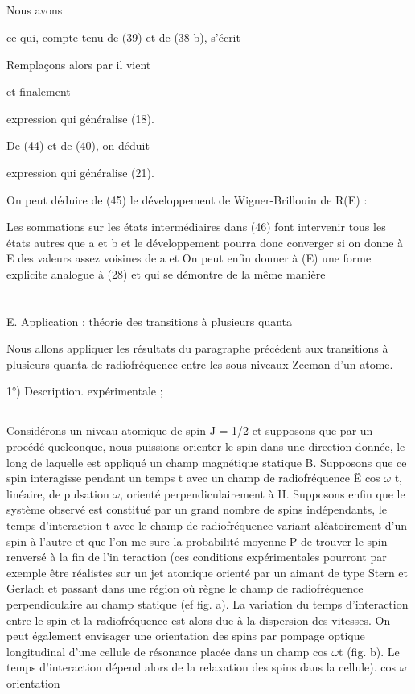 \subsection{}%
Nous avons

ce qui, compte tenu de (39) et de (38-b), s'écrit

Remplaçons alors  par  il vient

et finalement

expression qui généralise (18).

De (44) et de (40), on déduit

expression qui généralise (21).

On peut déduire de (45) le développement de Wigner-Brillouin de R(E) :

Les sommations sur les états intermédiaires dans (46) font intervenir tous les
états autres que a et b et le développement pourra donc converger si on donne
à E des valeurs assez voisines de a et
On peut enfin donner à (E) une forme explicite analogue à (28) et qui
se démontre de la même manière

\section{}
E. Application : théorie des transitions à plusieurs quanta

Nous allons appliquer les résultats du paragraphe précédent aux
transitions à plusieurs quanta de radiofréquence entre les sous-niveaux
Zeeman d'un atome.

1°) Description. expérimentale ;

\subsection{}%
Considérons un niveau atomique de spin J = 1/2 et supposons que
par un procédé quelconque, nous puissions orienter le spin dans une direction donnée, le long de laquelle est appliqué un champ magnétique statique
B. Supposons que ce spin interagisse pendant un temps t avec un champ de
radiofréquence Ë cos $\omega$ t, linéaire, de pulsation $\omega$, orienté perpendiculairement à H. Supposons enfin que le système observé est constitué par un
grand nombre de spins indépendants, le temps d'interaction t avec le champ
de radiofréquence variant aléatoirement d'un spin à l'autre et que l'on me
sure la probabilité moyenne P de trouver le spin renversé à la fin de l'in
teraction (ces conditions expérimentales pourront par exemple être réalistes
sur un jet atomique orienté par un aimant de type Stern et Gerlach et passant
dans une région où règne le champ de radiofréquence perpendiculaire au champ
statique (ef fig. a). La variation du temps d'interaction entre le spin et
la radiofréquence est alors due à la dispersion des vitesses. On peut également envisager une orientation des spins par pompage optique longitudinal
d'une cellule de résonance placée dans un champ cos $\omega$t (fig. b). Le
temps d'interaction dépend alors de la relaxation des spins dans la cellule).
cos $\omega$
orientation

